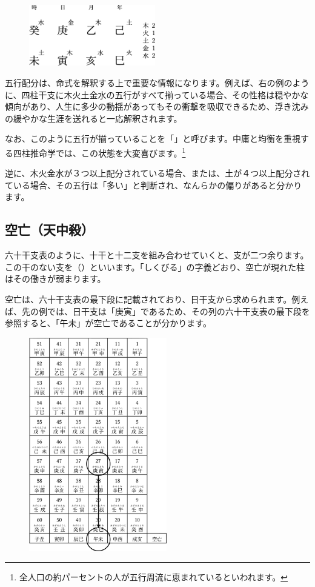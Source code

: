 \documentclass[a5paper,11pt,dvipdfmx]{tarticle}
\begin{document}
\begin{figure}[h]
  \includegraphics[width=55mm,angle=90]{figs/figure3-12.eps}
\end{figure}

五行配分は、命式を解釈する上で重要な情報になります。例えば、右の例のように、四柱干支に木火土金水の五行がすべて揃っている場合、その性格は穏やかな傾向があり、人生に多少の動揺があってもその衝撃を吸収できるため、浮き沈みの緩やかな生涯を送れると一応解釈されます。

なお、このように五行が揃っていることを「」と呼びます。中庸と均衡を重視する四柱推命学では、この状態を大変喜びます。\footnote{全人口の約パーセントの人が五行周流に恵まれているといわれます。}

逆に、木火金水が３つ以上配分されている場合、または、土が４つ以上配分されている場合、その五行は「多い」と判断され、なんらかの偏りがあると分かります。

\subsection{空亡（天中殺）}
六十干支表のように、十干と十二支を組み合わせていくと、支が二つ余ります。この干のない支を（）といいます。「しくびる」の字義どおり、空亡が現れた柱はその働きが弱まります。

空亡は、六十干支表の最下段に記載されており、日干支から求められます。例えば、先の例では、日干支は「庚寅」であるため、その列の六十干支表の最下段を参照すると、「午未」が空亡であることが分かります。

\begin{figure}[h]
  \centering
  \includegraphics[width=60mm,angle=90]{figs/figure3-13.eps}
\end{figure}
\end{document}
